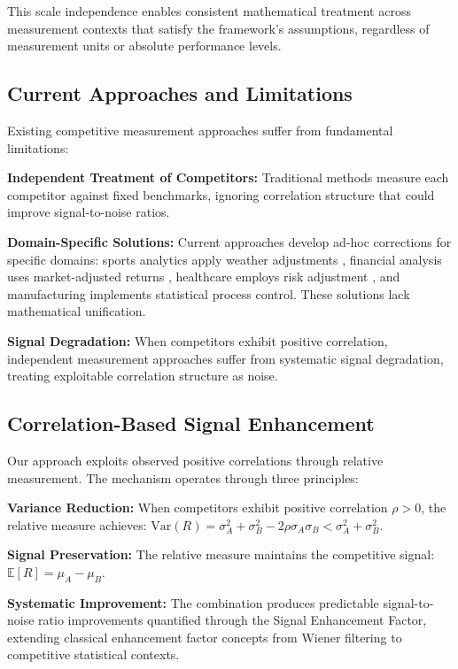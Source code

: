 This scale independence enables consistent mathematical treatment across measurement contexts that satisfy the framework's assumptions, regardless of measurement units or absolute performance levels.

\subsection{Current Approaches and Limitations}

Existing competitive measurement approaches suffer from fundamental limitations:

\textbf{Independent Treatment of Competitors:} Traditional methods measure each competitor against fixed benchmarks, ignoring correlation structure that could improve signal-to-noise ratios.

\textbf{Domain-Specific Solutions:} Current approaches develop ad-hoc corrections for specific domains: sports analytics apply weather adjustments \cite{forrest2000forecasting, boulier2003predicting}, financial analysis uses market-adjusted returns \cite{sharpe1994sharpe}, healthcare employs risk adjustment \cite{hanushek2010generalizations}, and manufacturing implements statistical process control. These solutions lack mathematical unification.

\textbf{Signal Degradation:} When competitors exhibit positive correlation, independent measurement approaches suffer from systematic signal degradation, treating exploitable correlation structure as noise.

\subsection{Correlation-Based Signal Enhancement}

Our approach exploits observed positive correlations through relative measurement. The mechanism operates through three principles:

\textbf{Variance Reduction:} When competitors exhibit positive correlation $\rho > 0$, the relative measure achieves: $\text{Var}(R) = \sigma^2_A + \sigma^2_B - 2\rho\sigma_A\sigma_B < \sigma^2_A + \sigma^2_B$.

\textbf{Signal Preservation:} The relative measure maintains the competitive signal: $\mathbb{E}[R] = \mu_A - \mu_B$.

\textbf{Systematic Improvement:} The combination produces predictable signal-to-noise ratio improvements quantified through the Signal Enhancement Factor, extending classical enhancement factor concepts from Wiener filtering \cite{hardie2007fast} to competitive statistical contexts.

